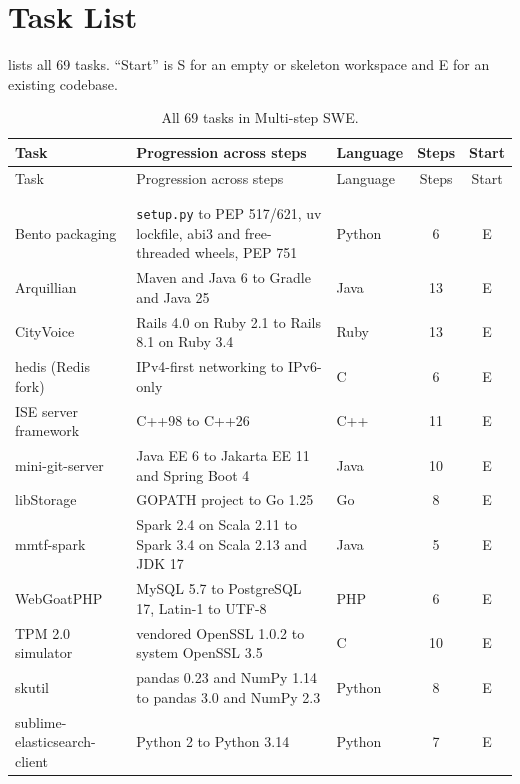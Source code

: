 \documentclass{article}
\newcommand{\bench}{Multi-step SWE\xspace}
\begin{document}
\section{Task List}
\label{app:tasks}

 lists all 69 tasks. ``Start'' is S for an empty or
skeleton workspace and E for an existing codebase.

{\footnotesize
\setlength{\tabcolsep}{4pt}
\begin{longtable}{@{}>{\raggedright\arraybackslash}p{3.8cm} >{\raggedright\arraybackslash}p{8.6cm} l c c@{}}
  \toprule
  Task & Progression across steps & Language & Steps & Start \\
  \midrule
  \endfirsthead
  \toprule
  Task & Progression across steps & Language & Steps & Start \\
  \midrule
  \endhead
  \bottomrule
  \endfoot
  \bottomrule
  \addlinespace[4pt]
  \caption{All 69 tasks in \bench.}\label{tab:tasklist}\\
  \endlastfoot
  \multicolumn{5}{@{}l}{\textit{Migration (13 tasks)}} \\
  Bento packaging & \texttt{setup.py} to PEP 517/621, uv lockfile, abi3 and free-threaded wheels, PEP 751 & Python & 6 & E \\
  Arquillian & Maven and Java 6 to Gradle and Java 25 & Java & 13 & E \\
  CityVoice & Rails 4.0 on Ruby 2.1 to Rails 8.1 on Ruby 3.4 & Ruby & 13 & E \\
  hedis (Redis fork) & IPv4-first networking to IPv6-only & C & 6 & E \\
  ISE server framework & C++98 to C++26 & C++ & 11 & E \\
  mini-git-server & Java EE 6 to Jakarta EE 11 and Spring Boot 4 & Java & 10 & E \\
  libStorage & GOPATH project to Go 1.25 & Go & 8 & E \\
  mmtf-spark & Spark 2.4 on Scala 2.11 to Spark 3.4 on Scala 2.13 and JDK 17 & Java & 5 & E \\
  WebGoatPHP & MySQL 5.7 to PostgreSQL 17, Latin-1 to UTF-8 & PHP & 6 & E \\
  TPM 2.0 simulator & vendored OpenSSL 1.0.2 to system OpenSSL 3.5 & C & 10 & E \\
  skutil & pandas 0.23 and NumPy 1.14 to pandas 3.0 and NumPy 2.3 & Python & 8 & E \\
  sublime-elasticsearch-client & Python 2 to Python 3.14 & Python & 7 & E \\

\end{longtable}}
\end{document}
